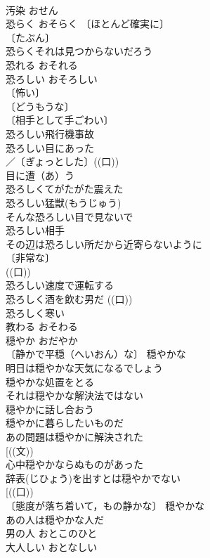\documentclass[8pt]{extreport}
\begin{document}
\begin{CJK}{UTF8}{min}
\\	汚染	おせん	
\\	恐らく	おそらく	〔ほとんど確実に〕
\\	〔たぶん〕
\\	恐らくそれは見つからないだろう 
\\	恐れる	おそれる	
\\	恐ろしい	おそろしい	
\\	〔怖い〕
\\	〔どうもうな〕
\\	〔相手として手ごわい〕
\\	恐ろしい飛行機事故 
\\	恐ろしい目にあった 
\\	／〔ぎょっとした〕((口)) 
\\	目に遭（あ）う　
\\	恐ろしくてがたがた震えた 
\\	恐ろしい猛獣(もうじゅう) 
\\	そんな恐ろしい目で見ないで 
\\	恐ろしい相手 
\\	その辺は恐ろしい所だから近寄らないように 
\\	〔非常な〕
\\	((口)) 
\\	恐ろしい速度で運転する 
\\	恐ろしく酒を飲む男だ ((口)) 
\\	恐ろしく寒い 
\\	教わる	おそわる	
\\	穏やか	おだやか	
\\	〔静かで平穏（へいおん）な〕 穏やかな 
\\	明日は穏やかな天気になるでしょう 
\\	穏やかな処置をとる 
\\	それは穏やかな解決法ではない 
\\	穏やかに話し合おう 
\\	穏やかに暮らしたいものだ 
\\	あの問題は穏やかに解決された 
\\	[((文))
\\	心中穏やかならぬものがあった 
\\	辞表(じひょう)を出すとは穏やかでない 
\\	[((口)) 
\\	〔態度が落ち着いて，もの静かな〕 穏やかな 
\\	あの人は穏やかな人だ 
\\	男の人	おとこのひと	
\\	大人しい	おとなしい	

\end{CJK}
\end{document}
